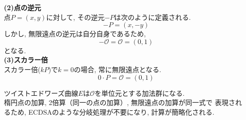 \noindent \textbf{(2)点の逆元}\\
\indent 点$P=(x,y)$に対して, その逆元$-P$は次のように定義される.
\begin{equation}
  -P=(x,-y)
\end{equation}
\indent しかし, 無限遠点の逆元は自分自身であるため, 
\begin{equation}
  -\mathcal{O}=\mathcal{O}=(0,1)
\end{equation}
となる.\\
\noindent \textbf{(3)スカラー倍}\\
\indent スカラー倍($kP$)で$k=0$の場合, 常に無限遠点となる.
\begin{equation}
  0\cdot P=\mathcal{O}=(0,1)
\end{equation}

\indent ツイストエドワーズ曲線$E$は$\mathcal{O}$を単位元とする加法群になる.\\
楕円点の加算, 2倍算（同一の点の加算）, 無限遠点の加算が同一式で
表現されるため, ECDSAのような分岐処理が不要になり, 計算が簡略化される.\\



